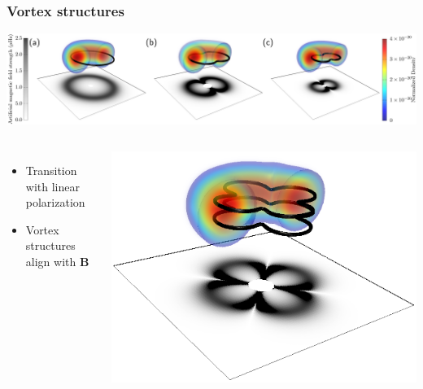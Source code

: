 \documentclass{beamer}
\begin{document}
\begin{frame}
\frametitle{Vortex structures}
\includegraphics[width=\textwidth]{../data/3d/vortex_transition.png}
\begin{columns}
\begin{itemize}
\item Transition with linear polarization
\item Vortex structures align with $\mathbf{B}$
\end{itemize}
\center \includegraphics[width=\linewidth]{../data/3d/HE21_3d.png}
\end{columns}
\end{frame}
\end{document}
